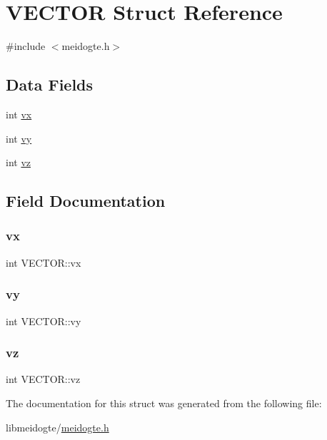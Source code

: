 \hypertarget{structVECTOR}{}\section{V\+E\+C\+T\+OR Struct Reference}
\label{structVECTOR}


{\ttfamily \#include $<$meidogte.\+h$>$}

\subsection*{Data Fields}
\begin{DoxyCompactItemize}
\item 
int \hyperlink{structVECTOR_a1fe3d6691e16974bd1fec2208f7893b9}{vx}
\item 
int \hyperlink{structVECTOR_aee6a2dfdc66b9d4ddde9974cd561187f}{vy}
\item 
int \hyperlink{structVECTOR_a420a39a69ffa3d2425d69bf93a6f4dc3}{vz}
\end{DoxyCompactItemize}


\subsection{Field Documentation}
\mbox{\label{structVECTOR_a1fe3d6691e16974bd1fec2208f7893b9}} 
\subsubsection{\texorpdfstring{vx}{vx}}
{\footnotesize\ttfamily int V\+E\+C\+T\+O\+R\+::vx}

\mbox{\label{structVECTOR_aee6a2dfdc66b9d4ddde9974cd561187f}} 
\subsubsection{\texorpdfstring{vy}{vy}}
{\footnotesize\ttfamily int V\+E\+C\+T\+O\+R\+::vy}

\mbox{\label{structVECTOR_a420a39a69ffa3d2425d69bf93a6f4dc3}} 
\subsubsection{\texorpdfstring{vz}{vz}}
{\footnotesize\ttfamily int V\+E\+C\+T\+O\+R\+::vz}



The documentation for this struct was generated from the following file\+:\begin{DoxyCompactItemize}
\item 
libmeidogte/\hyperlink{meidogte_8h}{meidogte.\+h}\end{DoxyCompactItemize}
